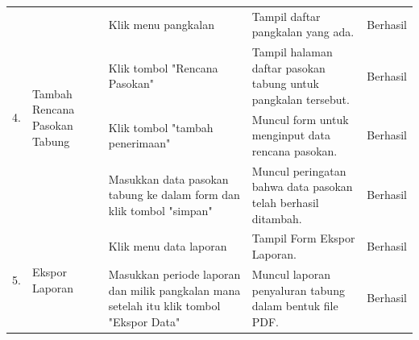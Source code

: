 \begin{longtable}{ |c|p{3cm}|p{3cm}|p{3cm}|p{2cm}|}
	
	\multirow{4}{*}{4.}  & 	\multirow{4}{*}{\parbox{3cm}{\centering Tambah Rencana Pasokan Tabung}} & Klik menu pangkalan           & Tampil daftar pangkalan yang ada.             & Berhasil \\ \cline{3-5}
	& & Klik tombol "Rencana Pasokan"           & Tampil halaman daftar pasokan tabung untuk pangkalan tersebut.             & Berhasil \\ \cline{3-5}
	& & Klik tombol "tambah penerimaan"           & Muncul form untuk menginput data rencana pasokan.             & Berhasil \\ \cline{3-5}
	& & Masukkan data pasokan tabung ke dalam form dan klik tombol "simpan"     & Muncul peringatan bahwa data pasokan telah berhasil ditambah.             & Berhasil \\ \hline
	
	\multirow{2}{*}{5.}  & 	\multirow{2}{*}{Ekspor Laporan} & Klik menu data laporan          & Tampil Form Ekspor Laporan.             & Berhasil \\ \hline
	& & Masukkan periode laporan dan milik pangkalan mana setelah itu klik tombol "Ekspor Data"     & Muncul laporan penyaluran tabung dalam bentuk file PDF.             & Berhasil \\ \hline
		
	\end{longtable}
	
